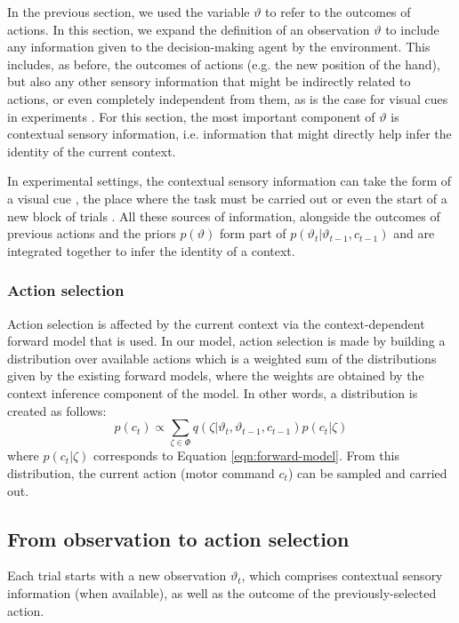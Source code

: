 \documentclass[a4paper,doc,floatsintext,natbib]{apa6}
\def \eref #1{Equation \ref{#1}}   %
\begin{document}
In the previous section, we used the variable $\vartheta$ to refer to the outcomes of actions. In this section, we expand the definition of an observation $\vartheta$ to include any information given to the decision-making agent by the environment. This includes, as before, the outcomes of actions (e.g. the new position of the hand), but also any other sensory information that might be indirectly related to actions, or even completely independent from them, as is the case for visual cues in experiments \cite[e.g.][]{Addou_Colored_2011}. For this section, the most important component of $\vartheta$ is contextual sensory information, i.e. information that might directly help infer the identity of the current context.

In experimental settings, the contextual sensory information can take the form of a visual cue \citep[e.g.][]{Lee_Dual_2009,Kim_Neural_2015}, the place where the task must be carried out \citep[e.g.][]{Forano_Timescales_2020,Shadmehr_Adaptive_1994} or even the start of a new block of trials \citep{Ethier_Spontaneous_2008}. All these sources of information, alongside the outcomes of previous actions and the priors $p(\vartheta)$ form part of $p(\vartheta_t | \vartheta_{t-1}, c_{t-1})$ and are integrated together to infer the identity of a context.


\subsubsection{Action selection}
Action selection is affected by the current context via the context-dependent forward model that is used. In our model, action selection is made by building a distribution over available actions which is a weighted sum of the distributions given by the existing forward models, where the weights are obtained by the context inference component of the model. In other words, a distribution is created as follows:
\begin{equation}
p(c_t) \propto \displaystyle\sum_{\zeta \in \Phi}q(\zeta | \vartheta_t, \vartheta_{t-1}, c_{t-1}) p(c_t | \zeta) \label{eq:action-selection}
\end{equation}
where $p(c_t | \zeta)$ corresponds to \eref{eqn:forward-model}. From this distribution, the current action (motor command $c_t$) can be sampled and carried out.


\subsection{From observation to action selection}
Each trial starts with a new observation $\vartheta_t$, which comprises contextual sensory information (when available), as well as the outcome of the previously-selected action.
\end{document}
